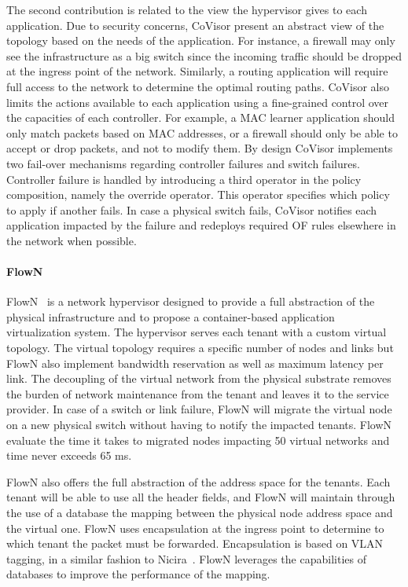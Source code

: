 The second contribution is related to the view the hypervisor gives to each application.
Due to security concerns, CoVisor present an abstract view of the topology based on the needs of the application. 
For instance, a firewall may only see the infrastructure as a big switch since the incoming traffic should be dropped at the ingress point of the network.
Similarly, a routing application will require full access to the network to determine the optimal routing paths.
CoVisor also limits the actions available to each application using a fine-grained control over the capacities of each controller.
For example, a MAC learner application should only match packets based on MAC addresses, or a firewall should only be able to accept or drop packets, and not to modify them.
By design CoVisor implements two fail-over mechanisms regarding controller failures and switch failures.
Controller failure is handled by introducing a third operator in the policy composition, namely the override operator. This operator specifies which policy to apply if another fails.
In case a physical switch fails, CoVisor notifies each application impacted by the failure and redeploys required OF rules elsewhere in the network when possible.

\paragraph{FlowN}
FlowN~\cite{FlowN-Drutskoy2012} is a network hypervisor designed to provide a full abstraction of the physical infrastructure and to propose a container-based application virtualization system. 
The hypervisor serves each tenant with a custom virtual topology. The virtual topology requires a specific number of nodes and links but FlowN also implement bandwidth reservation as well as maximum latency per link. The decoupling of the virtual network from the physical substrate removes the burden of network maintenance from the tenant and leaves it to the service provider. In case of a switch or link failure, FlowN will migrate the virtual node on a new physical switch without having to notify the impacted tenants.
FlowN evaluate the time it takes to migrated nodes impacting 50 virtual networks and time never exceeds 65 ms.

FlowN also offers the full abstraction of the address space for the tenants.
Each tenant will be able to use all the header fields, and FlowN will maintain through the use of a database the mapping between the physical node address space and the virtual one. FlowN uses encapsulation at the ingress point to determine to which tenant the packet must be forwarded. Encapsulation is based on VLAN tagging, in a similar fashion to Nicira~\cite{nicira}.   
FlowN leverages the capabilities of databases to improve the performance of the mapping.


